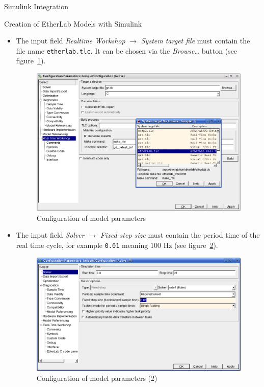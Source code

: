 \begin{ighsec}{Simulink Integration}
\begin{ighsec}{Creation of EtherLab Models with Simulink}
\begin{itemize}
\item The input field \textit{Realtime Workshop} $\rightarrow$
  \textit{System target file} must contain the file name
  \texttt{etherlab.tlc}. It can be chosen via the
  \textit{Browse\ldots} button (see figure~\ref{fig:konfiguration}).
  \begin{figure}[H]
    \begin{center}
      \includegraphics[width=.9\textwidth]{images/config_param.png}
      \caption{Configuration of model parameters}
      \label{fig:konfiguration}
    \end{center}
  \end{figure}
\item The input field \textit{Solver} $\rightarrow$ \textit{Fixed-step
    size} must contain the period time of the real time cycle, for
  example \texttt{0.01} meaning $100$ Hz (see
  figure~\ref{fig:config_solver}).
  \begin{figure}[H]
    \begin{center}
      \includegraphics[width=.9\textwidth]{images/config_solver.png}
      \caption{Configuration of model parameters (2)}
      \label{fig:config_solver}
    \end{center}
  \end{figure}
\end{itemize}


\end{ighsec}
\end{ighsec}
